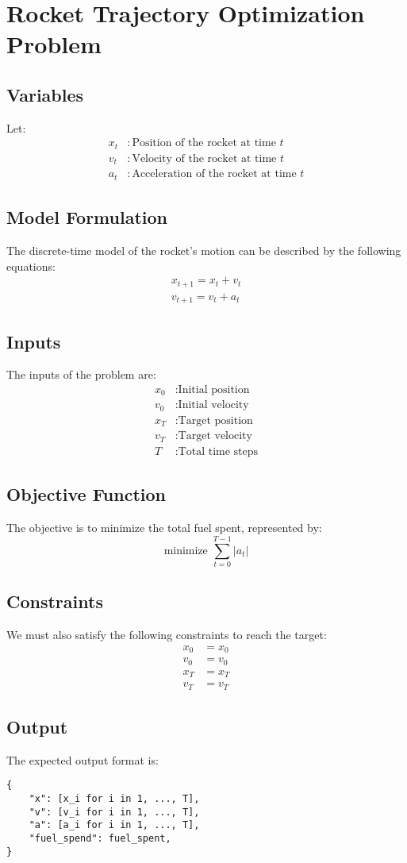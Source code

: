 \documentclass{article}
\begin{document}
\section*{Rocket Trajectory Optimization Problem}

\subsection*{Variables}
Let:
\begin{align*}
x_t & : \text{Position of the rocket at time } t \\
v_t & : \text{Velocity of the rocket at time } t \\
a_t & : \text{Acceleration of the rocket at time } t
\end{align*}

\subsection*{Model Formulation}
The discrete-time model of the rocket's motion can be described by the following equations:
\begin{align}
x_{t+1} = x_t + v_t \\
v_{t+1} = v_t + a_t
\end{align}

\subsection*{Inputs}
The inputs of the problem are:
\begin{align*}
x_0 & : \text{Initial position} \\
v_0 & : \text{Initial velocity} \\
x_T & : \text{Target position} \\
v_T & : \text{Target velocity} \\
T & : \text{Total time steps}
\end{align*}

\subsection*{Objective Function}
The objective is to minimize the total fuel spent, represented by:
\[
\text{minimize } \sum_{t=0}^{T-1} |a_t|
\]

\subsection*{Constraints}
We must also satisfy the following constraints to reach the target:
\begin{align*}
x_0 & = x_0 \\
v_0 & = v_0 \\
x_T & = x_T \\
v_T & = v_T
\end{align*}

\subsection*{Output}
The expected output format is:
\begin{verbatim}
{
    "x": [x_i for i in 1, ..., T],
    "v": [v_i for i in 1, ..., T],
    "a": [a_i for i in 1, ..., T],
    "fuel_spend": fuel_spent,
}
\end{verbatim}
\end{document}
